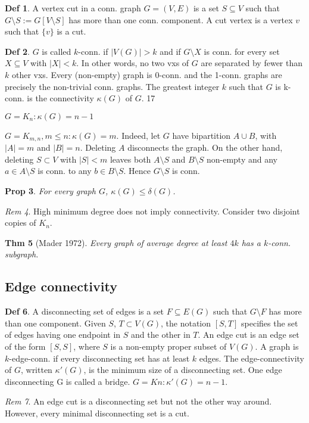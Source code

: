 \documentclass[11pt, fleqn, a4paper, landscape]{article}
\theoremstyle{plain} %
\newtheorem{thm}{Thm}
\newtheorem{pro}[thm]{Prop}
\theoremstyle{remark} %
\newtheorem{rem}[thm]{Rem}
\theoremstyle{definition} %
\newtheorem{defi}[thm]{Def}
\begin{document}
\begin{multicols}{5}
\begin{defi}
A vertex cut in a conn. graph $G = (V,E)$ is a set $ S \subseteq V$ such that $G\setminus S := G[V \setminus S]$ has more than one conn. component. A cut vertex is a vertex $v$ such that $\{v\}$ is a cut.
\end{defi}
\begin{defi}
$G$ is called $k$-conn. if $|V (G)|> k$ and if $G\setminus X$ is conn. for every set $X \subseteq V$ with $|X|< k$. In other words, no two vxs of $G$ are separated by fewer than $k$ other vxs. Every (non-empty) graph is 0-conn. and the 1-conn. graphs are precisely the non-trivial conn. graphs. The greatest integer $k$ such that $G$ is k-conn. is the connectivity $\kappa (G)$ of $G$.
17
\item $G = K_n: \kappa (G) = n - 1$
\item $G = K_{m,n}, m \le n: \kappa (G) = m$. Indeed, let $G$ have bipartition $A \cup B$, with $|A|= m$  and $|B|= n$. Deleting $A$ disconnects the graph. On the other hand, deleting $S \subset V$ with $|S|< m$ leaves both $A\setminus S$ and $B\setminus S$ non-empty and any $a \in A\setminus S$ is conn. to any $b \in B \setminus S$. Hence $G\setminus S$ is conn.
\end{defi}
\begin{pro}
For every graph $G$, $\kappa (G) \le \delta(G)$.
\end{pro} 

\begin{rem}
High minimum degree does not imply connectivity. Consider two disjoint copies of $K_n$.
\end{rem}
\begin{thm}[Mader 1972]
Every graph of average degree at least $4k$ has a $k$-conn. subgraph.
\end{thm}

\subsection{Edge connectivity}
\begin{defi}
A disconnecting set of edges is a set $F \subseteq E(G)$ such that $G\setminus F$ has more than one component. Given $S$, $T \subset V (G)$, the notation $[S, T]$ specifies the set of edges having one endpoint
in $S$ and the other in $T$. An edge cut is an edge set of the form $[S, S]$, where $S$ is a non-empty proper subset of $V (G)$. A graph is $k$-edge-conn. if every disconnecting set has at least $k$ edges.
The edge-connectivity of $G$, written $\kappa'(G)$, is the minimum size of a disconnecting set. One edge disconnecting G is called a bridge.
$G = Kn: \kappa'(G) = n - 1.$
\end{defi}
\addtocounter{thm}{1}
\begin{rem}
An edge cut is a disconnecting set but not the other way around. However, every minimal disconnecting set is a cut.
\end{rem}


\end{multicols}
\end{document}
